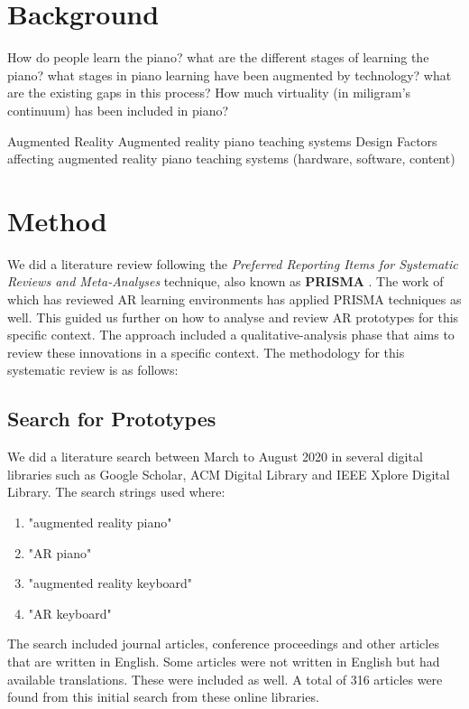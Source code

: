 \documentclass[sigchi, review]{acmart}
\begin{document}
\section{Background}
\label{sec: bg}
How do people learn the piano? what are the different stages of learning the piano? what stages in piano learning have been augmented by technology? what are the existing gaps in this process? How much virtuality (in miligram's continuum) has been included in piano? 

Augmented Reality
Augmented reality piano teaching systems
Design Factors affecting augmented reality piano teaching systems (hardware, software, content)

\section{Method}
\label{sec: method}
We did a literature review following the \textit{Preferred Reporting Items for Systematic Reviews and Meta-Analyses} technique, also known as \textbf{PRISMA} \cite{moher2009preferred}. The work of \citet{santos2013augmented} which has reviewed AR learning environments has applied PRISMA techniques as well. This guided us further on how to analyse and review AR prototypes for this specific context. The approach included a  qualitative-analysis phase that aims to review these innovations in a specific context. The methodology for this systematic review is as follows: 

\subsection{Search for Prototypes}
\label{subsec: search}
We did a literature search between March to August 2020 in several digital libraries such as Google Scholar, ACM Digital Library and IEEE Xplore Digital Library. The search strings used where:
\begin{enumerate}
    \item "augmented reality piano"
    \item "AR piano"
    \item "augmented reality keyboard"
    \item "AR keyboard"
\end{enumerate}
The search included journal articles, conference proceedings and other articles that are written in English. Some articles were not written in English but had available translations. These were included as well. A total of 316 articles were found from this initial search from these online libraries. 
\end{document}
